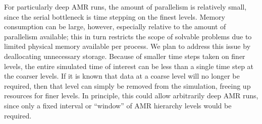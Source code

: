 \documentclass[11pt,letterpaper]{article}
\begin{document}






%
For particularly deep AMR runs, the amount of parallelism is
relatively small, since the serial bottleneck is time stepping on the
finest levels.  Memory consumption can be large, however, especially
relative to the amount of parallelism available; this in turn
restricts the scope of solvable problems due to limited physical
memory available per process.  We plan to address this issue by
deallocating unnecessary storage.  Because of smaller time steps taken
on finer levels, the entire simulated time of interest can be less
than a single time step at the coarser levels.  If it is known that
data at a coarse level will no longer be required, then that level can
simply be removed from the simulation, freeing up resources for finer
levels.  In principle, this could allow arbitrarily deep AMR runs,
since only a fixed interval or ``window'' of AMR hierarchy levels
would be required.
\end{document}
